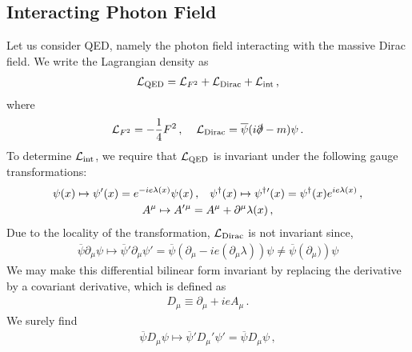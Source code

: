 \subsection{Interacting Photon Field}
Let us consider QED, namely the photon field interacting with the massive Dirac field.
We write the Lagrangian density as
\begin{eqnarray}
{\cal L}_{\mbox{\scriptsize QED}}
 = 
{\cal L}_{{\scriptsize F^2}}
+ 
{\cal L}_{\mbox{\scriptsize Dirac}}
+ 
{\cal L}_{\mbox{\scriptsize int}}\,,
\label{eqn:QEDLagr.symbolic}
\end{eqnarray}
where
\begin{eqnarray}
{\cal L}_{{\scriptsize F^2}}
=
- \frac{1}{4}F^2\,,
\hspace{4mm}
{\cal L}_{\mbox{\scriptsize Dirac}}
= 
 \overline{\psi}(i \slashed{\partial} - m) \psi \,.
\end{eqnarray}
To determine ${\cal L}_{\mbox{\scriptsize int}}$,
we require that ${\cal L}_{\mbox{\scriptsize QED}}$
is invariant under the following gauge transformations:
\begin{gather}
\psi (x) \mapsto \psi' (x) = e^{-ie \lambda(x)} \psi(x)
\,,
\hspace{3mm}
\psi^\dagger  (x) \mapsto  \psi^{\dagger}{}' (x)
=
\psi^\dagger  (x) e^{ie \lambda(x)}\,,
\\
A^\mu \mapsto A'{}^{\mu} = A^\mu + \partial^\mu \lambda(x)\,,
\end{gather}
Due to the locality of the transformation, ${\cal L}_{\mbox{\scriptsize Dirac}}$ is
not invariant since,
\begin{eqnarray}
 \overline{\psi} \partial_\mu  \psi 
 \mapsto
 \overline{\psi}' \partial_\mu  \psi'
 =
 \overline{\psi} \left(\partial_\mu  - ie (\partial_\mu \lambda) \right)\psi
 \neq
  \overline{\psi} \left(\partial_\mu ) \right)\psi
\end{eqnarray}
We may make this differential bilinear form invariant by replacing 
the derivative by a covariant derivative, which is defined as
\begin{eqnarray}
D_\mu \equiv \partial_\mu + ie A_\mu\,.
\end{eqnarray}
We surely find
\begin{eqnarray*}
 \overline{\psi} D_\mu  \psi 
 \mapsto
 \overline{\psi}' D_\mu'  \psi'
 =
 \overline{\psi} D_\mu  \psi \,,
\end{eqnarray*}
